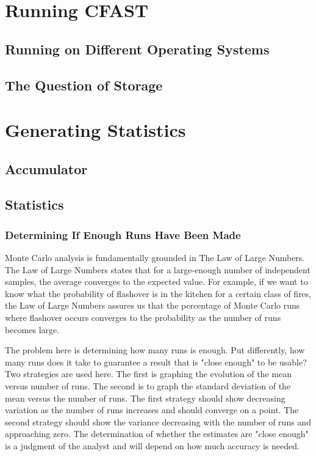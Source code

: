 \documentclass[12pt,twoside]{book}
\begin{document}
\clearpage

\section{Running CFAST}

\subsection{Running on Different Operating Systems}

\subsection{The Question of Storage}

\section{Generating Statistics}

\subsection{Accumulator}

\subsection{Statistics}

\subsubsection{Determining If Enough Runs Have Been Made}

Monte Carlo analysis is fundamentally grounded in The Law of Large Numbers. The Law of Large Numbers states that for a large-enough number of independent samples, the average converges to the expected value. For example, if we want to know what the probability of flashover is in the kitchen for a certain class of fires, the Law of Large Numbers assures us that the percentage of Monte Carlo runs where flashover occurs converges to the probability as the number of runs becomes large.

The problem here is determining how many runs is enough. Put differently, how many runs does it take to guarantee a result that is "close enough" to be usable? Two strategies are used here. The first is graphing the evolution of the mean versus number of runs. The second is to graph the standard deviation of the mean versus the number of runs. The first strategy should show decreasing variation as the number of runs increases and should converge on a point. The second strategy should show the variance decreasing with the number of runs and approaching zero. The determination of whether the estimates are "close enough" is a judgment of the analyst and will depend on how much accuracy is needed.
\end{document}
